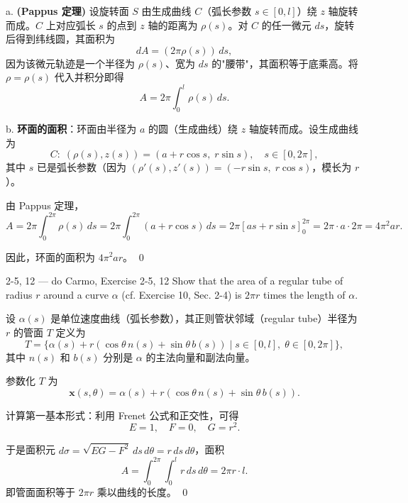 \begin{solution}
a. \textbf{(Pappus 定理)} 设旋转面 $S$ 由生成曲线 $C$（弧长参数 $s \in [0,l]$）绕 $z$ 轴旋转而成。$C$ 上对应弧长 $s$ 的点到 $z$ 轴的距离为 $\rho(s)$。对 $C$ 的任一微元 $ds$，旋转后得到纬线圆，其面积为
\[
dA = (2\pi\rho(s))\, ds,
\]
因为该微元轨迹是一个半径为 $\rho(s)$、宽为 $ds$ 的"腰带"，其面积等于底乘高。将 $\rho = \rho(s)$ 代入并积分即得
\[
A = 2\pi \int_0^l \rho(s)\, ds.
\]

b. \textbf{环面的面积}：环面由半径为 $a$ 的圆（生成曲线）绕 $z$ 轴旋转而成。设生成曲线为
\[
C: \; (\rho(s), z(s)) = (a + r\cos s,\; r\sin s),\quad s \in [0, 2\pi],
\]
其中 $s$ 已是弧长参数（因为 $(\rho'(s), z'(s)) = (-r\sin s,\; r\cos s)$，模长为 $r$）。

由 Pappus 定理，
\[
A = 2\pi \int_0^{2\pi} \rho(s)\, ds = 2\pi \int_0^{2\pi} (a + r\cos s)\, ds = 2\pi [as + r\sin s]_0^{2\pi} = 2\pi \cdot a \cdot 2\pi = 4\pi^2 ar.
\]

因此，环面的面积为 $4\pi^2 ar$。
\qed
\end{solution}

\begin{exercise}{2-5, 12 — do Carmo, Exercise 2-5, 12}
Show that the area of a regular tube of radius $r$ around a curve $\alpha$ (cf. Exercise 10, Sec. 2-4) is $2\pi r$ times the length of $\alpha$.
\end{exercise}

\begin{solution}
设 $\alpha(s)$ 是单位速度曲线（弧长参数），其正则管状邻域（regular tube）半径为 $r$ 的管面 $T$ 定义为
\[
T = \{\alpha(s) + r(\cos\theta\, n(s) + \sin\theta\, b(s)) \;|\; s \in [0,l],\; \theta \in [0,2\pi]\},
\]
其中 $n(s)$ 和 $b(s)$ 分别是 $\alpha$ 的主法向量和副法向量。

参数化 $T$ 为
\[
\mathbf{x}(s, \theta) = \alpha(s) + r(\cos\theta\, n(s) + \sin\theta\, b(s)).
\]

计算第一基本形式：利用 Frenet 公式和正交性，可得
\[
E = 1,\quad F = 0,\quad G = r^2.
\]

于是面积元 $d\sigma = \sqrt{EG - F^2}\, ds\, d\theta = r\, ds\, d\theta$，面积
\[
A = \int_0^{2\pi} \int_0^l r\, ds\, d\theta = 2\pi r \cdot l.
\]
即管面面积等于 $2\pi r$ 乘以曲线的长度。
\qed
\end{solution}


